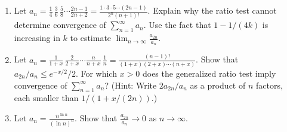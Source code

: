\documentclass{exercises}
\begin{document}
\begin{enumerate}[resume]
\item Let $a_{n}=\frac{1}{4}\,\frac{3}{6}\,\frac{5}{8}\cdots \frac{2n-1}{2n+2}=\frac{1\cdot3\cdot5\cdots(2n-1)}{2^{n}(n+1)!}$. Explain why the ratio test cannot determine convergence of $\sum_{n=1}^{\infty}a_{n}$. Use the fact that $1-1/(4k)$ is increasing in $k$ to estimate $\lim_{n\to \infty}\frac{a_{2n}}{a_{n}}$.
\item Let $a_{n}=\frac{1}{1+x}\,\frac{2}{2+x}\cdots \frac{n}{n+x}\,\frac{1}{n}=\frac{(n-1)!}{(1+x)(2+x)\cdots(n+x)}$. Show that $a_{2n}/a_{n}\le e^{-x/2}/2$. For which $x>0$ does the generalized ratio test imply convergence of $\sum_{n=1}^{\infty}a_{n}$? (Hint: Write $2a_{2n}/a_{n}$ as a product of $n$ factors, each smaller than $1/(1+x/(2n))$.)
\item Let $a_{n}=\frac{n^{\ln n}}{{(\ln n)}^{n}}$. Show that $\frac{a_{2n}}{a_{n}}\to0$ as $n\to \infty$.
\end{enumerate}
\end{document}
